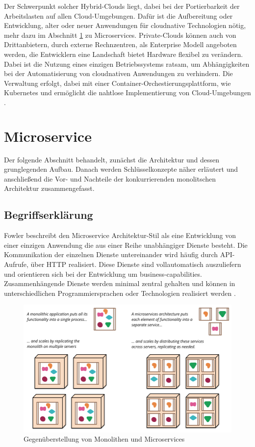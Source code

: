 Der Schwerpunkt solcher Hybrid-Clouds liegt, dabei bei der Portierbarkeit der Arbeitslasten auf allen Cloud-Umgebungen.
Dafür ist die Aufbereitung oder Entwicklung, alter oder neuer Anwendungen für cloudnative Technologien nötig, mehr dazu im Abschnitt \ref{Microservice} zu Microservices.
Private-Clouds können auch von Drittanbietern, durch externe Rechnzentren, als Enterprise Modell angeboten werden, die Entwicklern eine Landschaft bietet
Hardware flexibel zu verändern. Dabei ist die Nutzung eines einzigen Betriebssystems ratsam, um Abhängigkeiten bei der Automatisierung von cloudnativen Anwendungen zu verhindern.
Die Verwaltung erfolgt, dabei mit einer Container-Orchestierungsplattform, wie Kubernetes und ermöglicht die nahtlose Implementierung von Cloud-Umgebungen \cite{ibmHybrid}.

\section{Microservice}\label{Microservice}
Der folgende Abschnitt behandelt, zunächst die Architektur und dessen grunglegenden Aufbau.
Danach werden Schlüsselkonzepte näher erläutert und anschließend die Vor- und Nachteile der konkurrierenden monolitschen Architektur zusammengefasst.

\subsection{Begriffserklärung}
Fowler beschreibt den Microservice Architektur-Stil als eine Entwicklung von einer einzigen Anwendung die aus einer Reihe unabhängiger Dienste besteht. 
Die Kommunikation der einzelnen Dienste untereinander wird häufig durch API-Aufrufe, über HTTP realisiert. 
Diese Dienste sind vollautomatisch auszuliefern und orientieren sich bei der Entwicklung um business-capabilities. 
Zusammenhängende Dienste werden minimal zentral gehalten und können in unterschiedlichen Programmiersprachen oder Technologien realisiert werden \cite{FowlerMicroservice}.

\begin{figure}[!htb]
  \centering
  \includegraphics[width=0.8\columnwidth]{images/MonolithsAndMicroservices.png}
  \caption{Gegenüberstellung von Monolithen und Microservices \cite{FowlerMicroservice}}
  \label{fig:monlithmicroservice}
\end{figure}

